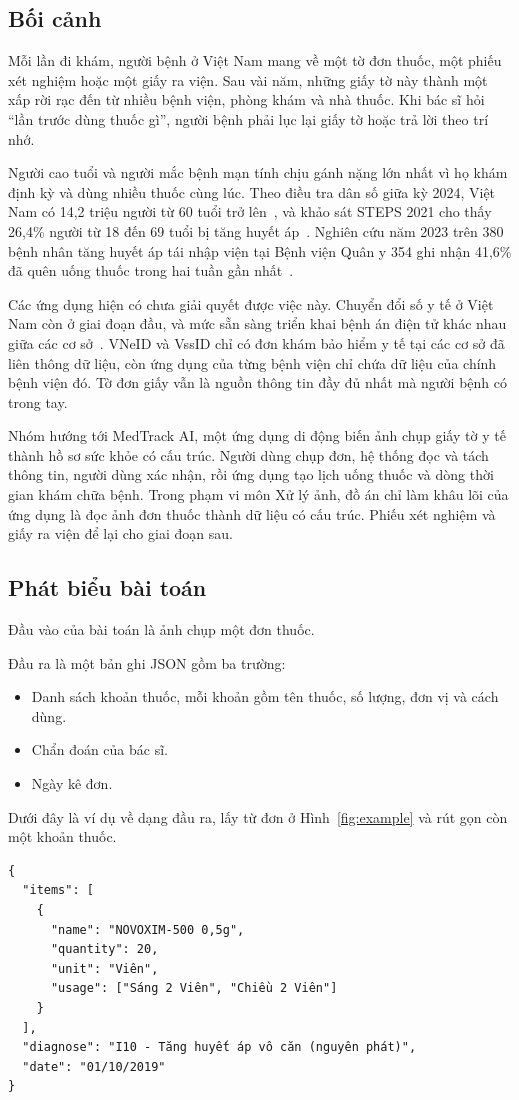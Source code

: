 \subsection{Bối cảnh}\label{sec:context}
Mỗi lần đi khám, người bệnh ở Việt Nam mang về một tờ đơn thuốc, một phiếu xét nghiệm hoặc một giấy ra viện.
Sau vài năm, những giấy tờ này thành một xấp rời rạc đến từ nhiều bệnh viện, phòng khám và nhà thuốc.
Khi bác sĩ hỏi ``lần trước dùng thuốc gì'', người bệnh phải lục lại giấy tờ hoặc trả lời theo trí nhớ.

Người cao tuổi và người mắc bệnh mạn tính chịu gánh nặng lớn nhất vì họ khám định kỳ và dùng nhiều thuốc cùng lúc.
Theo điều tra dân số giữa kỳ 2024, Việt Nam có 14,2 triệu người từ 60 tuổi trở lên~\cite{gso2025census}, và khảo sát STEPS 2021 cho thấy 26,4\% người từ 18 đến 69 tuổi bị tăng huyết áp~\cite{hoang2026steps}.
Nghiên cứu năm 2023 trên 380 bệnh nhân tăng huyết áp tái nhập viện tại Bệnh viện Quân y 354 ghi nhận 41,6\% đã quên uống thuốc trong hai tuần gần nhất~\cite{nguyen2023adherence}.

Các ứng dụng hiện có chưa giải quyết được việc này.
Chuyển đổi số y tế ở Việt Nam còn ở giai đoạn đầu, và mức sẵn sàng triển khai bệnh án điện tử khác nhau giữa các cơ sở~\cite{dang2021jmir}.
VNeID và VssID chỉ có đơn khám bảo hiểm y tế tại các cơ sở đã liên thông dữ liệu, còn ứng dụng của từng bệnh viện chỉ chứa dữ liệu của chính bệnh viện đó.
Tờ đơn giấy vẫn là nguồn thông tin đầy đủ nhất mà người bệnh có trong tay.

Nhóm hướng tới MedTrack AI, một ứng dụng di động biến ảnh chụp giấy tờ y tế thành hồ sơ sức khỏe có cấu trúc.
Người dùng chụp đơn, hệ thống đọc và tách thông tin, người dùng xác nhận, rồi ứng dụng tạo lịch uống thuốc và dòng thời gian khám chữa bệnh.
Trong phạm vi môn Xử lý ảnh, đồ án chỉ làm khâu lõi của ứng dụng là đọc ảnh đơn thuốc thành dữ liệu có cấu trúc.
Phiếu xét nghiệm và giấy ra viện để lại cho giai đoạn sau.

\subsection{Phát biểu bài toán}\label{sec:problem}
Đầu vào của bài toán là ảnh chụp một đơn thuốc.

Đầu ra là một bản ghi JSON gồm ba trường:
\begin{itemize}
  \item Danh sách khoản thuốc, mỗi khoản gồm tên thuốc, số lượng, đơn vị và cách dùng.
  \item Chẩn đoán của bác sĩ.
  \item Ngày kê đơn.
\end{itemize}
Dưới đây là ví dụ về dạng đầu ra, lấy từ đơn ở Hình~\ref{fig:example} và rút gọn còn một khoản thuốc.
\begin{Verbatim}[fontsize=\small, frame=single, framesep=2.5mm, xleftmargin=1cm, xrightmargin=1cm]
{
  "items": [
    {
      "name": "NOVOXIM-500 0,5g",
      "quantity": 20,
      "unit": "Viên",
      "usage": ["Sáng 2 Viên", "Chiều 2 Viên"]
    }
  ],
  "diagnose": "I10 - Tăng huyết áp vô căn (nguyên phát)",
  "date": "01/10/2019"
}
\end{Verbatim}

